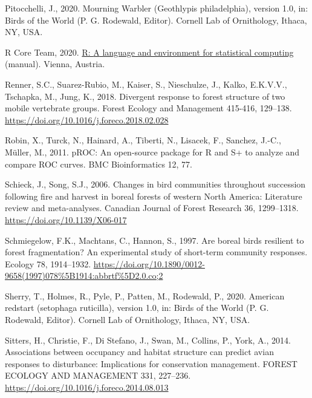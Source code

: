 \documentclass[
]{article}
\newlength{\cslhangindent}
\newlength{\cslentryspacingunit} %
\newenvironment{CSLReferences}[2] %
 {%
  \setlength{\parindent}{0pt}
  \ifodd #1
  \let\oldpar\par
  \def\par{\hangindent=\cslhangindent\oldpar}
  \fi
  \setlength{\parskip}{#2\cslentryspacingunit}
 }%
 {}
\begin{document}
\begin{CSLReferences}{1}{0}
\leavevmode{}%
Pitocchelli, J., 2020. Mourning {Warbler} ({Geothlypis} philadelphia), version 1.0, in: Birds of the {World} ({P}. {G}. {Rodewald}, {Editor}). Cornell Lab of Ornithology, Ithaca, NY, USA.

\leavevmode{}%
R Core Team, 2020. \href{https://www.R-project.org/}{R: {A} language and environment for statistical computing} (manual). Vienna, Austria.

\leavevmode{}%
Renner, S.C., Suarez-Rubio, M., Kaiser, S., Nieschulze, J., Kalko, E.K.V.V., Tschapka, M., Jung, K., 2018. Divergent response to forest structure of two mobile vertebrate groups. Forest Ecology and Management 415-416, 129--138. \url{https://doi.org/10.1016/j.foreco.2018.02.028}

\leavevmode{}%
Robin, X., Turck, N., Hainard, A., Tiberti, N., Lisacek, F., Sanchez, J.-C., Müller, M., 2011. {pROC}: An open-source package for {R} and {S}+ to analyze and compare {ROC} curves. BMC Bioinformatics 12, 77.

\leavevmode{}%
Schieck, J., Song, S.J., 2006. Changes in bird communities throughout succession following fire and harvest in boreal forests of western {North} {America}: {Literature} review and meta-analyses. Canadian Journal of Forest Research 36, 1299--1318. \url{https://doi.org/10.1139/X06-017}

\leavevmode{}%
Schmiegelow, F.K., Machtans, C., Hannon, S., 1997. Are boreal birds resilient to forest fragmentation? {An} experimental study of short-term community responses. Ecology 78, 1914--1932. \url{https://doi.org/10.1890/0012-9658(1997)078\%5B1914:abbrtf\%5D2.0.co;2}

\leavevmode{}%
Sherry, T., Holmes, R., Pyle, P., Patten, M., Rodewald, P., 2020. American redstart (setophaga ruticilla), version 1.0, in: Birds of the {World} ({P}. {G}. {Rodewald}, {Editor}). Cornell Lab of Ornithology, Ithaca, NY, USA.

\leavevmode{}%
Sitters, H., Christie, F., Di Stefano, J., Swan, M., Collins, P., York, A., 2014. Associations between occupancy and habitat structure can predict avian responses to disturbance: {Implications} for conservation management. FOREST ECOLOGY AND MANAGEMENT 331, 227--236. \url{https://doi.org/10.1016/j.foreco.2014.08.013}


\end{CSLReferences}
\end{document}
